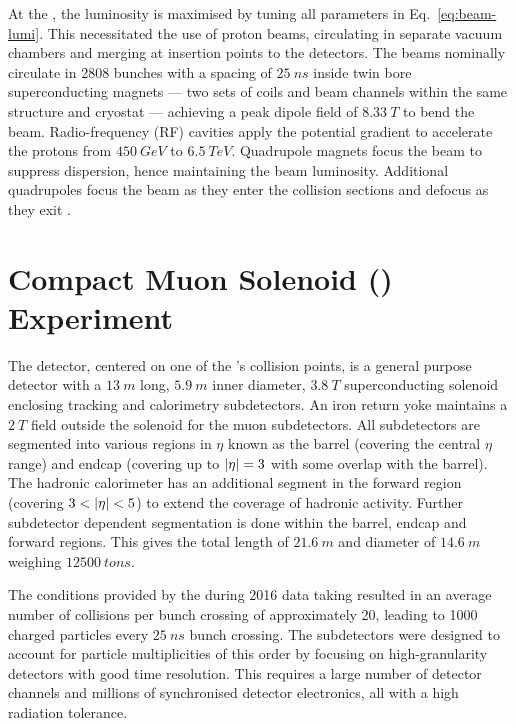 At the \LHC, the luminosity is maximised by tuning all parameters in
Eq.~\eqref{eq:beam-lumi}. This necessitated the use of proton beams, circulating
in separate vacuum chambers and merging at insertion points to the detectors.
The beams nominally circulate in 2808 bunches with a spacing of ${\SI{25}{ns}}$
inside twin bore superconducting magnets --- two sets of coils and beam channels
within the same structure and cryostat --- achieving a peak dipole field of
${\SI{8.33}{T}}$ to bend the beam. Radio-frequency (RF) cavities apply the
potential gradient to accelerate the protons from ${\SI{450}{GeV}}$ to
${\SI{6.5}{TeV}}$. Quadrupole magnets focus the beam to suppress dispersion,
hence maintaining the beam luminosity. Additional quadrupoles focus the
beam as they enter the collision sections and defocus as they exit 
\cite{Bruning:782076}.

\section{Compact Muon Solenoid (\CMS) Experiment}

The \CMS detector, centered on one of the \LHC's collision points, is a general
purpose detector with a ${\SI{13}{m}}$ long, ${\SI{5.9}{m}}$ inner diameter,
${\SI{3.8}{T}}$ superconducting solenoid enclosing tracking and calorimetry
subdetectors. An iron return yoke maintains a ${\SI{2}{T}}$ field outside the
solenoid for the muon subdetectors. All subdetectors are segmented into various
regions in $\eta$ known as the barrel (covering the central $\eta$ range) and
endcap (covering up to $|\eta|=3$ with some overlap with the barrel). The
hadronic calorimeter has an additional segment in the forward region (covering
$3<\aeta<5$) to extend the coverage of hadronic activity. Further subdetector
dependent segmentation is done within the barrel, endcap and forward regions.
This gives \CMS the total length of ${\SI{21.6}{m}}$ and diameter of
${\SI{14.6}{m}}$ weighing ${\SI{12500}{tons}}$.

The conditions provided by the \LHC during 2016 data taking resulted in an
average number of collisions per bunch crossing of approximately 20, leading
to 1000 charged particles every ${\SI{25}{ns}}$ bunch crossing. The
subdetectors were designed to account for particle multiplicities of this order
by focusing on high-granularity detectors with good time resolution. This
requires a large number of detector channels and millions of synchronised
detector electronics, all with a high radiation tolerance.

